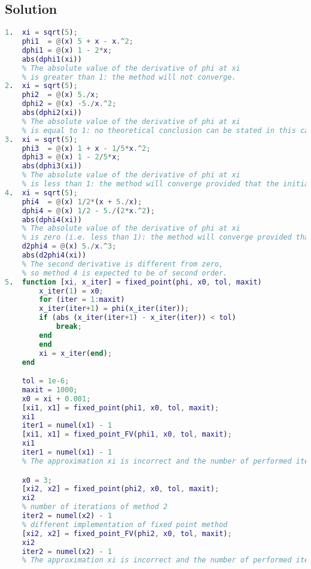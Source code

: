 \documentclass[12pt, a4paper]{report}
\newtheorem[style=M,bodystyle=\normalfont]{theorem}{Theorem}
\newtheorem[style=M,bodystyle=\normalfont]{corollary}{Corollary}
\newtheorem[style=M,bodystyle=\normalfont]{lemma}{Lemma}
\newtheorem[style=M,bodystyle=\normalfont]{definition}{Definition}
\begin{document}
    \subsection*{Solution}
        \begin{lstlisting}[language=Matlab]
1.  xi = sqrt(5);
    phi1  = @(x) 5 + x - x.^2;
    dphi1 = @(x) 1 - 2*x;
    abs(dphi1(xi))
    % The absolute value of the derivative of phi at xi
    % is greater than 1: the method will not converge.
2.  xi = sqrt(5);
    phi2  = @(x) 5./x;
    dphi2 = @(x) -5./x.^2;
    abs(dphi2(xi))
    % The absolute value of the derivative of phi at xi
    % is equal to 1: no theoretical conclusion can be stated in this case.
3.  xi = sqrt(5);
    phi3  = @(x) 1 + x - 1/5*x.^2;
    dphi3 = @(x) 1 - 2/5*x;
    abs(dphi3(xi))
    % The absolute value of the derivative of phi at xi
    % is less than 1: the method will converge provided that the initial guess x{(0)} is close enough to xi (local convergence).
4.  xi = sqrt(5);
    phi4  = @(x) 1/2*(x + 5./x);
    dphi4 = @(x) 1/2 - 5./(2*x.^2);
    abs(dphi4(xi))
    % The absolute value of the derivative of phi at xi
    % is zero (i.e. less than 1): the method will converge provided that the initial guess x{(0)} is close enough to xi (local convergence).
    d2phi4 = @(x) 5./x.^3;
    abs(d2phi4(xi))
    % The second derivative is different from zero,
    % so method 4 is expected to be of second order.
5.  function [xi, x_iter] = fixed_point(phi, x0, tol, maxit)
        x_iter(1) = x0;
        for (iter = 1:maxit)
        x_iter(iter+1) = phi(x_iter(iter));
        if (abs (x_iter(iter+1) - x_iter(iter)) < tol)
            break;
        end
        end
        xi = x_iter(end);
    end

    tol = 1e-6;
    maxit = 1000;
    x0 = xi + 0.001;
    [xi1, x1] = fixed_point(phi1, x0, tol, maxit);
    xi1
    iter1 = numel(x1) - 1
    [xi1, x1] = fixed_point_FV(phi1, x0, tol, maxit);
    xi1
    iter1 = numel(x1) - 1
    % The approximation xi is incorrect and the number of performed iterations is the maximum: as expected, the method did not converge.

    x0 = 3;
    [xi2, x2] = fixed_point(phi2, x0, tol, maxit);
    xi2
    % number of iterations of method 2
    iter2 = numel(x2) - 1
    % different implementation of fixed point method
    [xi2, x2] = fixed_point_FV(phi2, x0, tol, maxit);
    xi2
    iter2 = numel(x2) - 1
    % The approximation xi is incorrect and the number of performed iterations is the maximum: the method did not converge.


\end{lstlisting}
\end{document}
